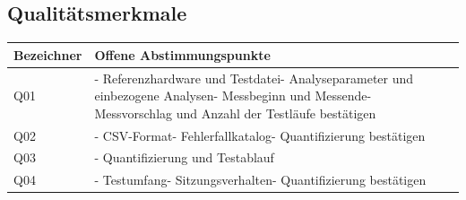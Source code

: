 \documentclass[a4paper,10pt]{article}
\newcommand{\sectionspace}[1]{\par\ifdim
                                      \dimexpr\pagegoal-\pagetotal\relax<#1\relax\newpage
\fi\addvspace{14pt}}
\begin{document}
        \subsection*{Qualitätsmerkmale}
        \begin{longtable}{>{\raggedright\arraybackslash}p{}>{\raggedright\arraybackslash}p{}}
            \toprule
            \textbf{Bezeichner} & \textbf{Offene Abstimmungspunkte}                                                                                                                                                  \\
            \midrule\endhead
            \bottomrule\endfoot
            Q01                 & - Referenzhardware und Testdatei\newline - Analyseparameter und einbezogene Analysen\newline - Messbeginn und Messende\newline - Messvorschlag und Anzahl der Testläufe bestätigen \\
            \midrule
            Q02                 & - CSV-Format\newline - Fehlerfallkatalog\newline - Quantifizierung bestätigen                                                                                                      \\
            \midrule
            Q03                 & - Quantifizierung und Testablauf                                                                                                                                                   \\
            \midrule
            Q04                 & - Testumfang\newline - Sitzungsverhalten\newline - Quantifizierung bestätigen                                                                                                      \\
        \end{longtable}
        \sectionspace{120pt}
\end{document}
